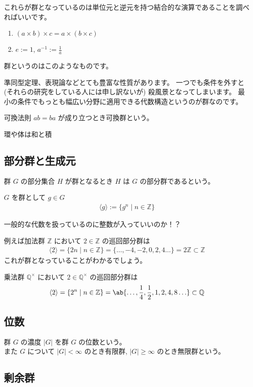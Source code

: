 \documentclass[uplatex,dvipdfmx,a4paper,11pt]{jlreq}
\newcommand{\QQ}{\mathbb{Q}}
\newcommand{\ZZ}{\mathbb{Z}}
\theoremstyle{definition}
\begin{document}
これらが群となっているのは単位元と逆元を持つ結合的な演算であることを調べればいいです。
\begin{enumerate}
  \item $(a \times b) \times c = a \times (b \times c)$
  \item $e := 1$, $a^{-1} := \frac{1}{a}$
\end{enumerate}

群というのはこのようなものです。

準同型定理、表現論などとても豊富な性質があります。
一つでも条件を外すと (それらの研究をしている人には申し訳ないが) 殺風景となってしまいます。
最小の条件でもっとも幅広い分野に適用できる代数構造というのが群なのです。

可換法則 $ab = ba$ が成り立つとき可換群という。

環や体は和と積

\subsection{部分群と生成元}

\begin{definition}[部分群]
  群 $G$ の部分集合 $H$ が群となるとき $H$ は $G$ の部分群であるという。
\end{definition}

\begin{definition}
  $G$ を群として $g\in G$
  \begin{align}
    \langle g\rangle := \{g^n\mid n\in\ZZ\}
  \end{align}
\end{definition}
一般的な代数を扱っているのに整数が入っていいのか！？

例えば加法群 $\ZZ$ において $2\in\ZZ$ の巡回部分群は
\begin{align}
  \langle 2\rangle = \{2n\mid n\in\ZZ\} = \{\ldots,-4, -2, 0, 2, 4\ldots\} = 2\ZZ \subset\ZZ
\end{align}
これが群となっていることがわかるでしょう。

乗法群 $\QQ^\times$ において $2\in\QQ^\times$ の巡回部分群は
\begin{align}
  \langle 2\rangle = \{2^n\mid n\in\ZZ\} = \ab\{\ldots, \frac{1}{4}, \frac{1}{2}, 1, 2, 4, 8\ldots\}\subset\QQ
\end{align}

\subsection{位数}
\begin{definition}[群の位数]
  群 $G$ の濃度 $|G|$ を群 $G$ の位数という。 \\
  また $G$ について $|G| < \infty$ のとき有限群, $|G| \geq \infty$ のとき無限群という。
\end{definition}


\subsection{剰余群}
\end{document}
